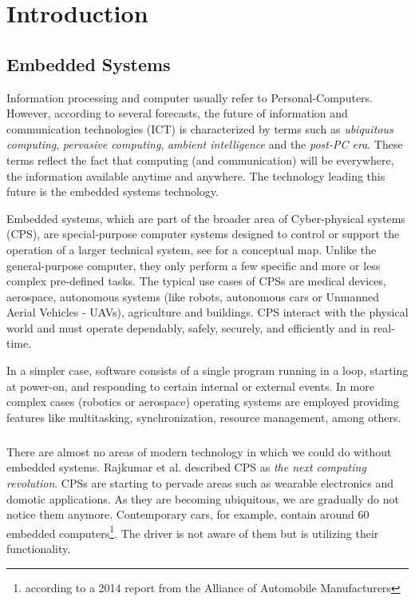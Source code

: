
\chapter{Introduction}

\ifpdf
    \graphicspath{{Chapters/Figs/Raster/}{Chapters/Figs/PDF/}{Chapters/Figs/}}
\else
    \graphicspath{{Chapters/Figs/Vector/}{Chapters/Figs/}}
\fi


\section{Embedded Systems}
Information processing and computer usually refer to Personal-Computers. However, according to several forecasts, the future of information and communication technologies (ICT) is characterized by terms such as \emph{ubiquitous computing}, \emph{pervasive computing}, \emph{ambient intelligence} and the \emph{post-PC era}. These terms reflect the fact that computing (and communication) will be everywhere, the information available anytime and anywhere. The technology leading this future is the embedded systems technology.%
\par Embedded systems, which are part of the broader area of Cyber-physical systems (CPS), are special-purpose computer systems designed to control or support the operation of a larger technical system, see \cite{BerkleyCPS} for a conceptual map. Unlike the general-purpose computer, they only perform a few specific and more or less complex pre-defined tasks. The typical use cases of CPSs are medical devices, aerospace, autonomous systems (like robots, autonomous cars or Unmanned Aerial Vehicles - UAVs), agriculture and buildings. CPS interact with the physical world and must operate dependably, safely, securely, and efficiently and in real-time.
\par In a simpler case, software consists of a single program running in a loop, starting at power-on, and responding to certain internal or external events. In more complex cases (robotics or aerospace) operating systems are employed providing features like multitasking, synchronization, resource management, among others.

\paragraph{}There are almost no areas of modern technology in which we could do without embedded systems. Rajkumar et al. \cite{Raj10} described CPS as \emph{the next computing revolution}. CPSs are starting to pervade areas such as wearable electronics and domotic applications. As they are becoming ubiquitous, we are gradually do not notice them anymore. Contemporary cars, for example, contain around 60 embedded computers\footnote{according to a 2014 report from the Alliance of Automobile Manufacturers}. The driver is not aware of them but is utilizing their functionality.

